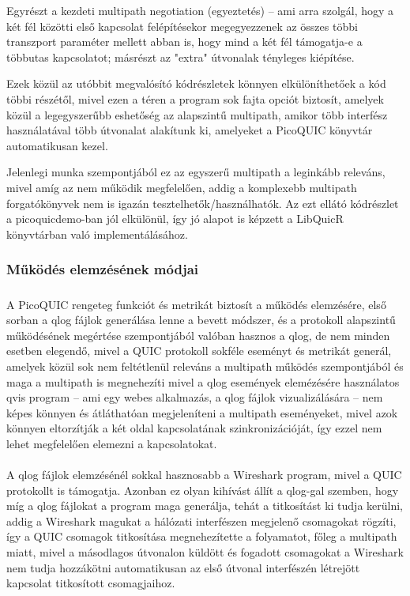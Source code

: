 \documentclass[a4paper,oneside]{article}
\begin{document}
Egyrészt a kezdeti multipath negotiation (egyeztetés) – ami arra szolgál, hogy a két fél közötti első
kapcsolat felépítésekor megegyezzenek az összes többi transzport paraméter mellett abban is, 
hogy mind a két fél támogatja-e a többutas kapcsolatot; másrészt az "extra" útvonalak tényleges kiépítése.

Ezek közül az utóbbit megvalósító kódrészletek könnyen elkülöníthetőek a kód többi részétől, mivel ezen a 
téren a program sok fajta opciót biztosít, amelyek közül a legegyszerűbb eshetőség az alapszintű 
multipath, amikor több interfész használatával több útvonalat alakítunk ki, amelyeket a PicoQUIC könyvtár automatikusan kezel.

Jelenlegi munka szempontjából ez az egyszerű multipath a leginkább releváns,
mivel amíg az nem működik megfelelően, addig a komplexebb multipath forgatókönyvek nem is igazán tesztelhetők/használhatók.
Az ezt ellátó kódrészlet a picoquicdemo-ban jól elkülönül, így jó alapot is képzett
a LibQuicR könyvtárban való implementálásához.

\subsubsection{Működés elemzésének módjai}

\subparagraph{}

A PicoQUIC rengeteg funkciót és metrikát biztosít a működés elemzésére, 
első sorban a qlog fájlok generálása lenne a bevett módszer, és
a protokoll alapszintű működésének megértése szempontjából valóban hasznos 
a qlog, de nem minden esetben elegendő, mivel a QUIC protokoll
sokféle eseményt és metrikát generál, amelyek közül sok nem feltétlenül releváns a 
multipath működés szempontjából és maga a multipath is megnehezíti mivel a qlog események 
elemézésére használatos qvis program\cite{qvis} – ami egy webes alkalmazás, a qlog 
fájlok vizualizálására – nem képes könnyen és átláthatóan megjeleníteni a multipath 
eseményeket, mivel azok könnyen eltorzítják a két oldal kapcsolatának 
szinkronizációját, így ezzel nem lehet megfelelően elemezni a kapcsolatokat.

\paragraph{}
A qlog fájlok elemzésénél sokkal hasznosabb a Wireshark program, mivel
a QUIC protokollt is támogatja.
Azonban ez olyan kihívást állít a qlog-gal szemben, hogy míg a 
qlog fájlokat a program maga generálja, tehát a titkosítást ki tudja kerülni, 
addig a Wireshark magukat a hálózati interfészen megjelenő csomagokat rögzíti, 
így a QUIC csomagok titkosítása megnehezítette a folyamatot, főleg a multipath 
miatt, mivel a másodlagos útvonalon küldött és fogadott csomagokat a Wireshark 
nem tudja hozzákötni automatikusan az első útvonal interfészén létrejött kapcsolat titkosított csomagjaihoz.
\end{document}
